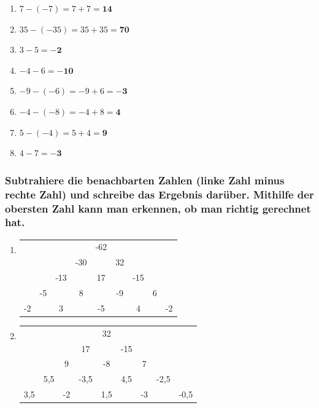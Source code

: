 \documentclass[a4paper,10pt]{article} %
\begin{document}
\begin{enumerate}
  \item \(7 - (-7) =
    7 + 7 =
    \mathbf{14}\) %

  \item \(35 - (-35) =
    35 + 35 =
    \mathbf{70}\) %

  \item \(3 - 5 =
    \mathbf{-2}\) %

  \item \(-4 - 6 =
    \mathbf{-10}\) %

  \item \(-9 - (-6) =
    -9 + 6 =
    \mathbf{-3}\) %

  \item \(-4 - (-8) =
    -4 + 8 =
    \mathbf{4}\) %

  \item \(5 - (-4) =
    5 + 4 =
    \mathbf{9}\) %

  \item \(4 - 7 =
    \mathbf{-3}\) %

\end{enumerate}

\subsubsection{Subtrahiere die benachbarten Zahlen (linke Zahl minus rechte Zahl)
und schreibe das Ergebnis darüber. Mithilfe der obersten Zahl kann man erkennen,
ob man richtig gerechnet hat.} %

\begin{enumerate}[label=\alph*)]

  \item %
  \vspace{1cm}
  \begin{center}
    \begin{tabular}{c c c c c c c c c}
      & & & & -62 & & & & \\
      & & & -30 & & 32 & & & \\
      & & -13 & & 17 & & -15 & & \\
      & -5 & & 8 & & -9 & & 6 & \\
      -2 & & 3 & & -5 & & 4 & & -2 \\
    \end{tabular}
  \end{center}

  \item %
  \vspace{1cm}
  \begin{center}
    \begin{tabular}{c c c c c c c c c}
      & & & & 32 & & & & \\
      & & & 17 & & -15 & & & \\
      & & 9 & & -8 & & 7 & \\
      & 5,5 & & -3,5 & & 4,5 & & -2,5 & \\
      3,5 & & -2 & & 1,5 & & -3 & & -0,5 \\
    \end{tabular}
  \end{center}

\end{enumerate}
\vspace{1cm}
\end{document}

